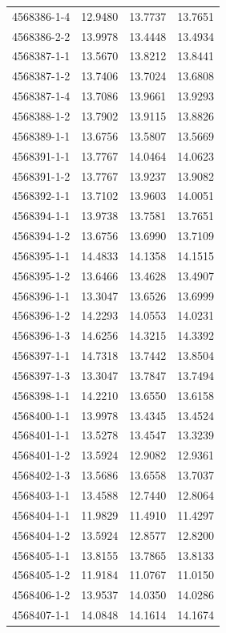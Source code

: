 \begin{longtable}{lrrr}
4568386-1-4 & 12.9480 & 13.7737 & 13.7651 \\
4568386-2-2 & 13.9978 & 13.4448 & 13.4934 \\
4568387-1-1 & 13.5670 & 13.8212 & 13.8441 \\
4568387-1-2 & 13.7406 & 13.7024 & 13.6808 \\
4568387-1-4 & 13.7086 & 13.9661 & 13.9293 \\
4568388-1-2 & 13.7902 & 13.9115 & 13.8826 \\
4568389-1-1 & 13.6756 & 13.5807 & 13.5669 \\
4568391-1-1 & 13.7767 & 14.0464 & 14.0623 \\
4568391-1-2 & 13.7767 & 13.9237 & 13.9082 \\
4568392-1-1 & 13.7102 & 13.9603 & 14.0051 \\
4568394-1-1 & 13.9738 & 13.7581 & 13.7651 \\
4568394-1-2 & 13.6756 & 13.6990 & 13.7109 \\
4568395-1-1 & 14.4833 & 14.1358 & 14.1515 \\
4568395-1-2 & 13.6466 & 13.4628 & 13.4907 \\
4568396-1-1 & 13.3047 & 13.6526 & 13.6999 \\
4568396-1-2 & 14.2293 & 14.0553 & 14.0231 \\
4568396-1-3 & 14.6256 & 14.3215 & 14.3392 \\
4568397-1-1 & 14.7318 & 13.7442 & 13.8504 \\
4568397-1-3 & 13.3047 & 13.7847 & 13.7494 \\
4568398-1-1 & 14.2210 & 13.6550 & 13.6158 \\
4568400-1-1 & 13.9978 & 13.4345 & 13.4524 \\
4568401-1-1 & 13.5278 & 13.4547 & 13.3239 \\
4568401-1-2 & 13.5924 & 12.9082 & 12.9361 \\
4568402-1-3 & 13.5686 & 13.6558 & 13.7037 \\
4568403-1-1 & 13.4588 & 12.7440 & 12.8064 \\
4568404-1-1 & 11.9829 & 11.4910 & 11.4297 \\
4568404-1-2 & 13.5924 & 12.8577 & 12.8200 \\
4568405-1-1 & 13.8155 & 13.7865 & 13.8133 \\
4568405-1-2 & 11.9184 & 11.0767 & 11.0150 \\
4568406-1-2 & 13.9537 & 14.0350 & 14.0286 \\
4568407-1-1 & 14.0848 & 14.1614 & 14.1674 \\

\end{longtable}
